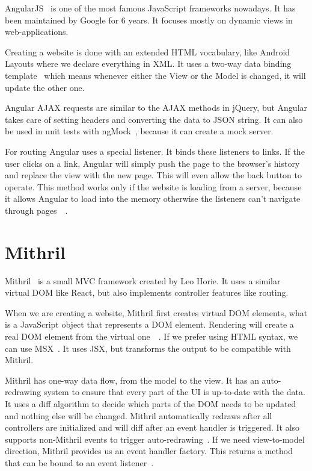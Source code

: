 AngularJS~\cite{Angular} is one of the most famous JavaScript frameworks nowadays.  It has been maintained by Google for 6 years. It focuses mostly on dynamic views in web-applications. 

Creating a website is done with an extended HTML vocabulary, like Android Layouts where we declare everything in XML.  It uses a two-way data binding template~\cite{Angular-Developer-DataBinding} which means whenever either the View or the Model is changed, it will update the other one.

Angular AJAX requests are similar to the AJAX methods in jQuery, but Angular takes care of setting headers and converting the data to JSON string. It can also be used in unit tests with ngMock~\cite{Angular-AJAX}, because it can create a mock server. 

For routing Angular uses a special listener. It binds these listeners to links. If the user clicks on a link, Angular will simply push the page to the browser's history and replace the view with the new page. This will even allow the back button to operate. This method works only if the website is loading from a server, because it allows Angular to load into the memory otherwise the listeners can't navigate through pages~\cite{Angular-Location}~\cite{Angular-Location2}.

\section{Mithril}

Mithril~\cite{Mithril} is a small MVC framework created by Leo Horie. It uses a similar virtual DOM like React, but also implements controller features like routing.

When we are creating a website, Mithril first creates virtual DOM elements, what is a JavaScript object that represents a DOM element. Rendering will create a real DOM element from the virtual one~\cite{Mithril-m}~\cite{Mithril-render}. If we prefer using HTML syntax, we can use MSX~\cite{MSX}. It uses JSX, but transforms the output to be compatible with Mithril. 

Mithril has one-way data flow, from the model to the view. It has an auto-redrawing system to ensure that every part of the UI is up-to-date with the data. It uses a diff algorithm to decide which parts of the DOM needs to be updated and nothing else will be changed. Mithril automatically redraws after all controllers are initialized and will diff after an event handler is triggered. It also supports non-Mithril events to trigger auto-redrawing~\cite{Mithril-redraw}. If we need view-to-model direction, Mithril provides us an event handler factory. This returns a method that can be bound to an event listener~\cite{Mithril-withAttr}.


